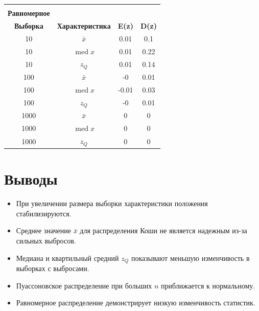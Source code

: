\documentclass[a4paper]{article}
\begin{document}
\begin{table}[!htbp]
{\begin{tabular}{|c|c|c|c|}
                \hline \\
                \multicolumn{1}{|c|}{\textbf{Равномерное}} \\
                \hline
                \textbf{Выборка} & \textbf{Характеристика} & \textbf{E(z)} & \textbf{D(z)} \\
                \hline
                10               & $\bar{x}$               & 0.01          & 0.1           \\
                10               & $\operatorname{med} x$  & 0.01          & 0.22          \\
                10               & $z_Q$                   & 0.01          & 0.14          \\
                100              & $\bar{x}$               & -0            & 0.01          \\
                100              & $\operatorname{med} x$  & -0.01         & 0.03          \\
                100              & $z_Q$                   & -0            & 0.01          \\
                1000             & $\bar{x}$               & 0             & 0             \\
                1000             & $\operatorname{med} x$  & 0             & 0             \\
                1000             & $z_Q$                   & 0             & 0             \\
                \hline
            \end{tabular}
        }
        \label{tab:table}
    \end{table}


    \section{Выводы}\label{sec:}
    \begin{itemize}
        \item При увеличении размера выборки характеристики положения стабилизируются.
        \item Среднее значение $\bar{x}$ для распределения Коши не является надежным из-за сильных выбросов.
        \item Медиана и квартильный средний $z_Q$ показывают меньшую изменчивость в выборках с выбросами.
        \item Пуассоновское распределение при больших $n$ приближается к нормальному.
        \item Равномерное распределение демонстрирует низкую изменчивость статистик.
    \end{itemize}
\end{document}

